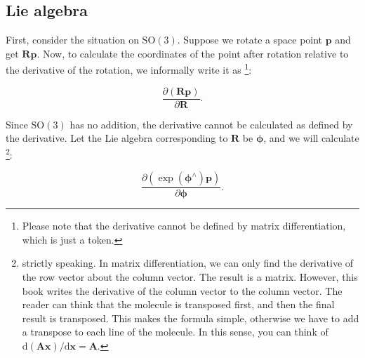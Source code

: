 \subsection{Lie algebra}

First, consider the situation on $\mathrm{SO}(3)$. Suppose we rotate a space point $\bm{p}$ and get $\bm{R} \bm{p}$. Now, to calculate the coordinates of the point after rotation relative to the derivative of the rotation, we informally write it as \footnote{Please note that the derivative cannot be defined by matrix differentiation, which is just a token. }:

\[
\frac{{\partial \left( {\bm{Rp}} \right)}}{{\partial \bm{R}}}.
\]

Since $\mathrm{SO}(3)$ has no addition, the derivative cannot be calculated as defined by the derivative. Let the Lie algebra corresponding to $\bm{R}$ be $\boldsymbol{\phi}$, and we will calculate \footnote{ strictly speaking. In matrix differentiation, we can only find the derivative of the row vector about the column vector. The result is a matrix. However, this book writes the derivative of the column vector to the column vector. The reader can think that the molecule is transposed first, and then the final result is transposed. This makes the formula simple, otherwise we have to add a transpose to each line of the molecule. In this sense, you can think of $\mathrm{d}(\bm{Ax})/\mathrm{d}\bm{x} = \bm{A}$. }:

\[ \frac{{\partial \left( {\exp \left( \boldsymbol{\phi} ^ \wedge \right) \bm{p}} \right)}}{{\partial \boldsymbol{\phi} }}. \]

